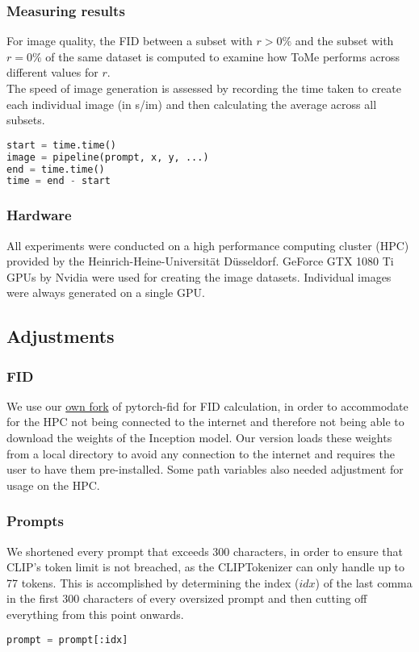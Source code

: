\subsubsection*{Measuring results}
For image quality, the FID between a subset with \(r > 0\%\) and the subset with \(r = 0\%\) of the same dataset is computed to examine how ToMe performs across different values for \(r\).\\
The speed of image generation is assessed by recording the time taken to create each individual image (in s/im) and then calculating the average across all subsets.
\begin{lstlisting}[language=Python]
start = time.time()
image = pipeline(prompt, x, y, ...)
end = time.time()
time = end - start
\end{lstlisting}



\subsubsection*{Hardware}
All experiments were conducted on a high performance computing cluster (HPC) provided by the Heinrich-Heine-Universität Düsseldorf.
GeForce GTX 1080 Ti GPUs by Nvidia were used for creating the image datasets. Individual images were always generated on a single GPU.



\subsection{Adjustments}
\subsubsection*{FID}
We use our \href{https://github.com/HNR1/pytorch_fid}{own fork} of pytorch-fid \cite{Seitzer2020FID} for FID calculation, in order to accommodate for the HPC not being connected to the internet and therefore not being able to download the weights of the Inception model. Our version loads these weights from a local directory to avoid any connection to the internet and requires the user to have them pre-installed. Some path variables also needed adjustment for usage on the HPC.



\subsubsection*{Prompts}
We shortened every prompt that exceeds 300 characters, in order to ensure that CLIP's token limit is not breached, as the CLIPTokenizer can only handle up to 77 tokens.
This is accomplished by determining the index (\(idx\)) of the last comma in the first 300 characters of every oversized prompt and then cutting off everything from this point onwards.
\begin{lstlisting}[language=Python]
prompt = prompt[:idx]
\end{lstlisting}



